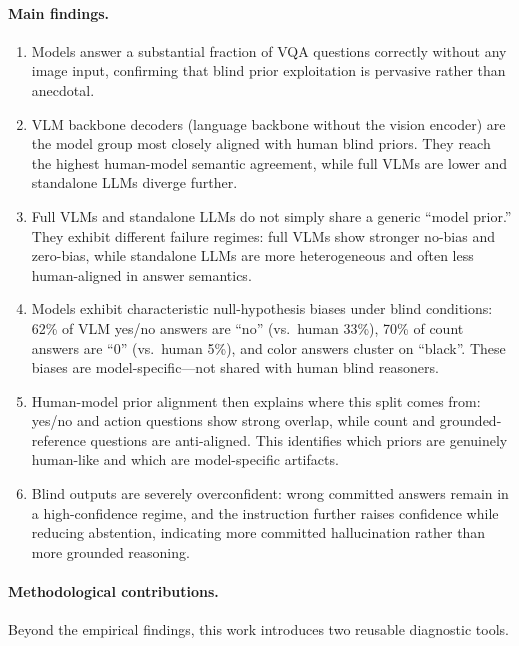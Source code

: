 \documentclass[letterpaper]{article}
\begin{document}
\paragraph{Main findings.}
\begin{enumerate}
    \item Models answer a substantial fraction of VQA questions correctly
    without any image input, confirming that blind prior exploitation is
    pervasive rather than anecdotal.

    \item VLM backbone decoders (language backbone without the vision encoder)
    are the model group most closely aligned with human blind priors. They
    reach the highest human-model semantic agreement, while full VLMs are lower
    and standalone LLMs diverge further.

    \item Full VLMs and standalone LLMs do not simply share a generic ``model
    prior.'' They exhibit different failure regimes: full VLMs show stronger
    no-bias and zero-bias, while standalone LLMs are more heterogeneous and
    often less human-aligned in answer semantics.

    \item Models exhibit characteristic null-hypothesis biases under blind
    conditions: 62\% of VLM yes/no answers are ``no'' (vs.\ human 33\%),
    70\% of count answers are ``0'' (vs.\ human 5\%), and color answers cluster
    on ``black''. These biases are model-specific---not shared with
    human blind reasoners.

    \item Human-model prior alignment then explains where this split comes
    from: yes/no and action questions show strong overlap, while count and
    grounded-reference questions are anti-aligned. This identifies which
    priors are genuinely human-like and which are model-specific artifacts.

    \item Blind outputs are severely overconfident: wrong committed answers
    remain in a high-confidence regime, and the instruction further raises
    confidence while reducing abstention, indicating more committed
    hallucination rather than more grounded reasoning.
\end{enumerate}

\paragraph{Methodological contributions.}
Beyond the empirical findings, this work introduces two reusable diagnostic tools.
\end{document}
